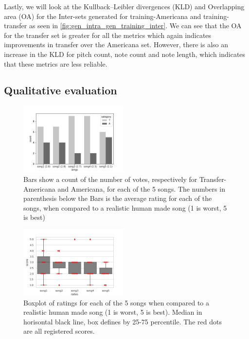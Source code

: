 \documentclass{IEEEtran}
\begin{document}
Lastly, we will look at the Kullback–Leibler divergences (KLD) and
Overlapping area (OA) for the Inter-sets generated for training-Americana and
training-transfer as seen in \autoref{fig:gen_intra_gen_training_inter}.
We can see that the OA for the transfer set is greater for all the metrics
which again indicates improvements in transfer over the Americana set.
However, there is also an increase in the KLD for pitch count, note count and
note length, which indicates that these metrics are less reliable.

\subsection{Qualitative evaluation}

\begin{figure}
    \centering
    \includegraphics[width=0.485\textwidth]{songs_category.png}
    \caption{
        Bars show a count of the number of votes, respectively for
        Transfer-Americana and Americana, for each of the 5 songs.
        The numbers in parenthesis below the Bars is the average rating
        for each of the songs, when compared to a realistic human made
        song (1 is worst, 5 is best)
    \label{fig:songs}
    } 
\end{figure}

\begin{figure}
    \centering
    \includegraphics[width=0.485\textwidth]{scores.png}
    \caption{
        Boxplot of ratings for each of the 5 songs when compared to a realistic
        human made song (1 is worst, 5 is best). Median in horisontal black line,
        box defines by 25-75 percentile. The red dots are all registered scores.
        \label{fig:scores}
    }
\end{figure}
\end{document}
